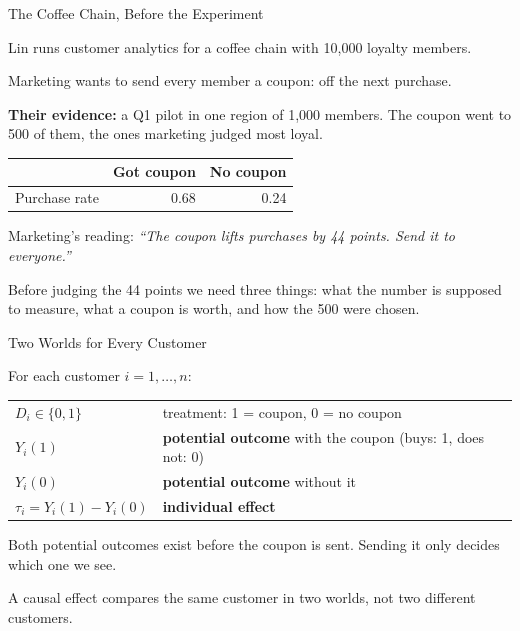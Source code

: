 \documentclass[aspectratio=169, 11pt, handout]{beamer}
\begin{document}
\begin{frame}{The Coffee Chain, Before the Experiment}

Lin runs customer analytics for a coffee chain with 10{,}000 loyalty members.

\bigskip

Marketing wants to send every member a coupon:  off the next purchase.

\bigskip

\textbf{Their evidence:} a Q1 pilot in one region of 1{,}000 members. The coupon went to 500 of them, the ones marketing judged most loyal.

\begin{center}
\small
\begin{tabular}{lrr}
\toprule
& \textbf{Got coupon} & \textbf{No coupon} \\
\midrule
Purchase rate & 0.68 & 0.24 \\
\bottomrule
\end{tabular}
\end{center}

\smallskip
\begin{center}
Marketing's reading: \emph{``The coupon lifts purchases by 44 points. Send it to everyone.''}
\end{center}

\medskip

\small Before judging the 44 points we need three things: what the number is supposed to measure, what a coupon is worth, and how the 500 were chosen.
\end{frame}

\begin{frame}{Two Worlds for Every Customer}

For each customer $i = 1, \dots, n$:

\medskip

\begin{center}
\begin{tabular}{ll}
$D_i \in \{0, 1\}$ & treatment: 1 = coupon, 0 = no coupon \\[0.3em]
$Y_i(1)$ & \textbf{potential outcome} with the coupon (buys: 1, does not: 0) \\[0.3em]
$Y_i(0)$ & \textbf{potential outcome} without it \\[0.3em]
$\tau_i = Y_i(1) - Y_i(0)$ & \textbf{individual effect}
\end{tabular}
\end{center}

\bigskip

Both potential outcomes exist before the coupon is sent. Sending it only decides which one we see.

\bigskip

A causal effect compares the same customer in two worlds, not two different customers.
\end{frame}
\end{document}
